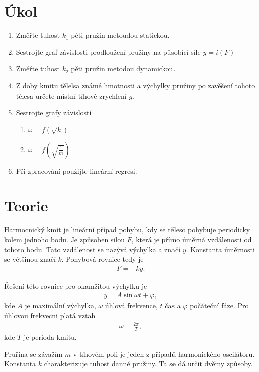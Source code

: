 \documentclass[a4paper,12pt]{article}
\begin{document}
\section{Úkol}
\begin{enumerate}
	\item Změřte tuhost $k_1$ pěti pružin metoudou statickou.
	\item Sestrojte graf závislosti prodloužení pružiny na působící síle 
		$y=i(F)$
	\item Změřte tuhost $k_2$ pěti pružin metodou dynamickou.
	\item Z doby kmitu tělelsa známé hmotnosti a výchylky pružiny po 
		zavěšení tohoto tělesa určete místní tíhové zrychlení $g$.
	\item Sestrojte grafy závislostí
	\begin{enumerate}
		\item $\omega = f (\sqrt{k})$
		\item $\omega = f \left(\sqrt{\frac{1}{m}}\right)$
	\end{enumerate}
	\item Při zpracování použijte lineární regresi. 
\end{enumerate}

\section{Teorie}
\noindent
Harmocnický kmit je lineární případ pohybu, kdy se těleso pohybuje periodicky kolem jednoho bodu.
Je způsoben silou $F$, která je přímo úměrná vzdálenosti od tohoto bodu. Tato vzdálenost se 
nazývá výchylka a značí $y$. Konstanta úměrnosti se většinou značí $k$. Pohybová rovnice tedy je
\begin{eqnarray}
	F=-ky.
\end{eqnarray}

Řešení této rovnice pro okamžitou výchylku je
\begin{eqnarray}
	y=A \sin{\omega t+ \varphi},
\end{eqnarray}
kde $A$ je maximální výchylka, $\omega$ úhlová frekvence, $t$ čas a $\varphi$ počáteční fáze.
Pro úhlovou frekvecni platá vztah
\begin{eqnarray}
	\omega = \frac{2\pi}{T},
	\label{omega}
\end{eqnarray}
kde $T$ je perioda kmitu.

Pruřina se závažím $m$ v tíhovém poli je jeden z případů harmonického oscilátoru. Konstanta $k$ 
charakterizuje tuhost danné pružiny. Ta se dá určit dvěmy způsoby. 
\end{document}
